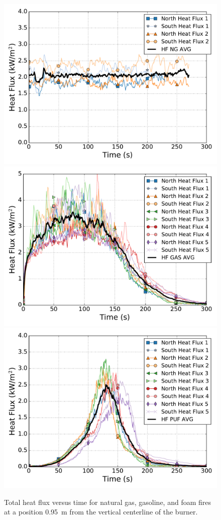 \documentclass[twoside]{uocthesis}
\begin{document}
{\begin{figure}[p]
  \centering
  \includegraphics[width=.635\columnwidth]{../Figures/HF_NG}\\
  \includegraphics[width=.635\columnwidth]{../Figures/HF_GAS}\\
  \includegraphics[width=.635\columnwidth]{../Figures/HF_PUF}\\
  \caption[Total heat flux versus time for natural gas, gasoline, and foam fires at 0.95~m]{Total heat flux versus time for natural gas, gasoline, and foam fires at a position 0.95~m from the vertical centerline of the burner.}
  \label{Flux}
\end{figure}

}
\end{document}
